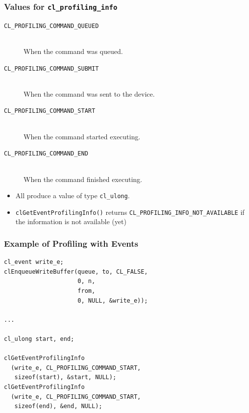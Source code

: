 \documentclass{beamer}
\begin{document}
\begin{frame}[fragile]
  \frametitle{Values for \texttt{cl\_profiling\_info}}

  \begin{description}
  \item[\texttt{CL\_PROFILING\_COMMAND\_QUEUED}]\hfill\\ When the
    command was queued.
  \item[\texttt{CL\_PROFILING\_COMMAND\_SUBMIT}]\hfill\\ When the
    command was sent to the device.
  \item[\texttt{CL\_PROFILING\_COMMAND\_START}]\hfill\\ When the
    command started executing.
  \item[\texttt{CL\_PROFILING\_COMMAND\_END}]\hfill\\ When the
    command finished executing.
  \end{description}

  \begin{itemize}
  \item All produce a value of type \lstinline{cl_ulong}.
  \item \lstinline{clGetEventProfilingInfo()} returns
    \lstinline{CL_PROFILING_INFO_NOT_AVAILABLE} if the information is
    not available (yet)
  \end{itemize}
\end{frame}

\begin{frame}[fragile]
  \frametitle{Example of Profiling with Events}

\begin{lstlisting}
cl_event write_e;
clEnqueueWriteBuffer(queue, to, CL_FALSE,
                     0, n,
                     from,
                     0, NULL, &write_e));

...

cl_ulong start, end;

clGetEventProfilingInfo
  (write_e, CL_PROFILING_COMMAND_START,
   sizeof(start), &start, NULL);
clGetEventProfilingInfo
  (write_e, CL_PROFILING_COMMAND_START,
   sizeof(end), &end, NULL);
\end{lstlisting}

\end{frame}
\end{document}

